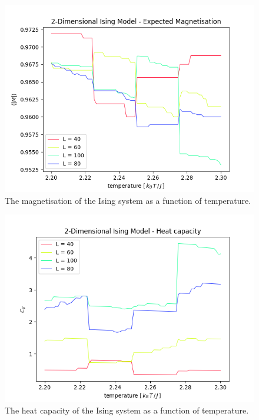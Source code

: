 \documentclass[nofootinbib,reprint,english]{revtex4-1}
\begin{document}
\begin{figure}[h!]
\centering
\includegraphics[scale=0.5]{../output/figures/experiment4/magnetisation_full.png}
\caption{The magnetisation of the Ising system as a function of temperature.}\label{fig:experiment4_magnetisation_full}
\end{figure}

\begin{figure}[h!]
\centering
\includegraphics[scale=0.5]{../output/figures/experiment4/heat_capacity_full.png}
\caption{The heat capacity of the Ising system as a function of temperature.}\label{fig:experiment4_heat_capacity_full}
\end{figure}
\end{document}
